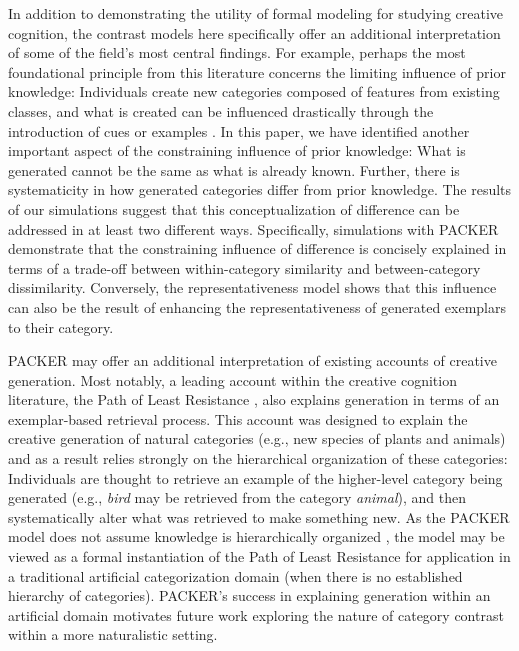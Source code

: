 \documentclass[12pt]{article}
\begin{document}
\begin{flushleft}
In addition to demonstrating the utility of formal modeling for studying
creative cognition, the contrast models here specifically offer an additional
interpretation of some of the field's most central findings. For example,
perhaps the most foundational principle from this literature concerns the
limiting influence of prior knowledge: Individuals create new categories
composed of features from existing classes, and what is created can be
influenced drastically through the introduction of cues or examples
\citep{marsh1999inadvertent,smith1993constraining}. In this paper, we have
identified another important aspect of the constraining influence of prior
knowledge: What is generated cannot be the same as what is already known.
Further, there is systematicity in how generated categories differ from prior
knowledge. The results of our simulations suggest that this conceptualization of
difference can be addressed in at least two different ways. Specifically,
simulations with PACKER demonstrate that the constraining influence of
difference is concisely explained in terms of a trade-off between
within-category similarity and between-category dissimilarity. Conversely, the
representativeness model shows that this influence can also be the result of
enhancing the representativeness of generated exemplars to their category.

PACKER may offer an additional interpretation of existing accounts of creative
generation. Most notably, a leading account within the creative cognition
literature, the Path of Least Resistance \citep{ward1994structured,ward1995s},
also explains generation in terms of an exemplar-based retrieval process. This
account was designed to explain the creative generation of natural categories
(e.g., new species of plants and animals) and as a result relies strongly on the
hierarchical organization of these categories: Individuals are thought to
retrieve an example of the higher-level category being generated (e.g.,
\textit{bird} may be retrieved from the category \textit{animal}), and then
systematically alter what was retrieved to make something new. As the PACKER
model does not assume knowledge is hierarchically organized \citep[this is true
of the exemplar view more broadly, see][]{murphy2016exemplar}, the model may be
viewed as a formal instantiation of the Path of Least Resistance for application
in a traditional artificial categorization domain (when there is no established
hierarchy of categories). PACKER's success in explaining generation within an
artificial domain motivates future work exploring the nature of category
contrast within a more naturalistic setting.


\end{flushleft}
\end{document}
